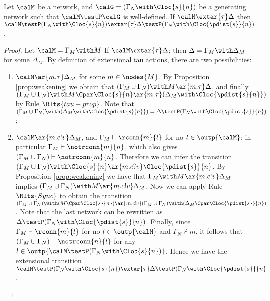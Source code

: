 \documentclass{LMCS}
\begin{document}
\begin{lem}
\label{lem:tau.strong}
Let $\calM$ be a network, and $\calG = (\Gamma_N 
\with \Cloc{s}{n})$ be a generating network such that 
$\calM \testP \calG$ is well-defined. 
If $\calM \extar{\tau} \Delta$ then 
$\calM \testP (\Gamma_N \with \Cloc{s}{n}) 
\extar{\tau} \Delta \testP (\Gamma_N \with \Cloc{\pdist{s}}{n})$.
\end{lem} 
\begin{proof}
Let $\calM = \Gamma_M \with M$
If $\calM \extar{\tau} \Delta$; then $\Delta = \Gamma_M \with \Delta_M$ 
for some $\Delta_M$. By definition of extensional 
tau actions, there are two possibilities: 
\begin{enumerate}
\item $\calM \ar{m.\tau} \Delta_M$ for some $m \in \nodes{M}$. 
By Proposition \ref{prop:weakening} we obtain that 
$(\Gamma_M \cup \Gamma_N) \with M \ar{m.\tau} \Delta$, and 
finally $(\Gamma_M \cup \Gamma_N) \with M \Cpar \Cloc{s}{n} 
\ar{m.\tau} (\Delta_M \with \Cloc{\pdist{s}{n}})$ by Rule 
$\Rlts{tau-prop}$.
Note that $(\Gamma_M \cup \Gamma_N) \with ( \Delta_M \with 
\Cloc{\pdist{s}{n}}) = \Delta \testP (\Gamma_N \with \Cloc{\pdist{s}}{n})$; 
\item $\calM \ar{m.c!v} \Delta_M$, and $\Gamma_M \vdash \rconn{m}{l}$ for 
no $l \in \outp{\calM}$; in particular $\Gamma_M \vdash \notrconn{m}{n}$, which 
also gives $(\Gamma_M \cup \Gamma_N) \vdash \notrconn{m}{n}$. Therefore 
we can infer the transition $(\Gamma_M \cup \Gamma_N) \with 
\Cloc{s}{n} \ar{m.c?v} \Cloc{\pdist{s}}{n}$. 
By Proposition \ref{prop:weakening} we have that 
$\Gamma_M \with M \ar{m.c!v} \Delta_M$ implies 
$(\Gamma_M \cup \Gamma_N) \with M \ar{m.c!v} \Delta_M$. 
Now we can apply Rule $\Rlts{Sync}$ to obtain the transition 
$(\Gamma_M \cup \Gamma_N) \with (M \Cpar \Cloc{s}{n}) \ar{m.c!v} 
(\Gamma_M \cup \Gamma_N) \with (\Delta_M \Cpar \Cloc{\pdist{s}}{n})$. 
Note that the last network can be rewritten as $\Delta \testP (\Gamma_N \with 
\Cloc{\pdist{s}}{n})$. Finally, since $\Gamma_M \vdash \rconn{m}{l}$ for no 
$l \in \outp{\calM}$ and $\Gamma_N \not\vdash m$, it follows that 
$(\Gamma_M \cup \Gamma_N) \vdash \notrconn{n}{l}$ for any $l 
\in \outp{\calM \testP (\Gamma_N \with \Cloc{s}{n})}$. Hence we have 
the extensional transition 
$\calM \testP (\Gamma_N \with \Cloc{s}{n}) \extar{\tau} 
\Delta \testP (\Gamma_N \with \Cloc{\pdist{s}}{n}$. 

\end{enumerate}
\end{proof}
\end{document}
